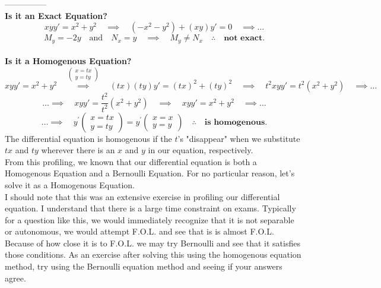 \documentclass[a4paper,12pt]{article} %
\begin{document}
 ---------------\\
 
 \textbf{Is it an Exact Equation?}
 $$ xyy' = x^2 + y^2 \quad\implies \quad (-x^2 - y^2) + (xy)y' = 0 \quad\implies \ldots $$
 $$ M_y = -2y \quad\text{and}\quad N_x = y  \quad\implies\quad \boxed{M_y \neq N_x \quad\therefore\quad \textbf{not exact.}}$$\\
 \textbf{Is it a Homogenous Equation?}
 $$ xyy' = x^2 + y^2 \quad\overset{\left(\begin{array}{l}
x=t x \\
y=t y
\end{array}\right)}\implies \quad (tx)(ty)y' = (tx)^2 + (ty)^2 \quad\implies \quad t^2xyy' = t^2(x^2 + y^2) \quad\implies \ldots$$
$$ \ldots\implies \quad xyy' = \frac{t^2}{t^2}(x^2 + y^2) \quad\implies \quad xyy' = x^2 + y^2 \quad\implies\ldots$$
$$ \ldots\implies\quad \boxed{y^{\prime}\left(\begin{array}{l}
x=t x \\
y=t y
\end{array}\right) = y^{\prime}\left(\begin{array}{l}
x=x \\
y=y
\end{array}\right) \quad\therefore\quad \textbf{is homogenous.}} $$
The differential equation is homogenous if the $t$'s "disappear" when we substitute $tx$ and $ty$ wherever there is an $x$ and $y$ in our equation, respectively.\\

From this profiling, we known that our differential equation is both a Homogenous Equation and a Bernoulli Equation. For no particular reason, let's solve it as a Homogenous Equation.\\

I should note that this was an extensive exercise in profiling our differential equation. I understand that there is a large time constraint on exams. Typically for a question like this, we would immediately recognize that it is not separable or autonomous, we would attempt F.O.L. and see that is is almost F.O.L. Because of how close it is to F.O.L. we may try Bernoulli and see that it satisfies those conditions. As an exercise after solving this using the homogenous equation method, try using the Bernoulli equation method and seeing if your answers agree.

\pagebreak
\end{document}
